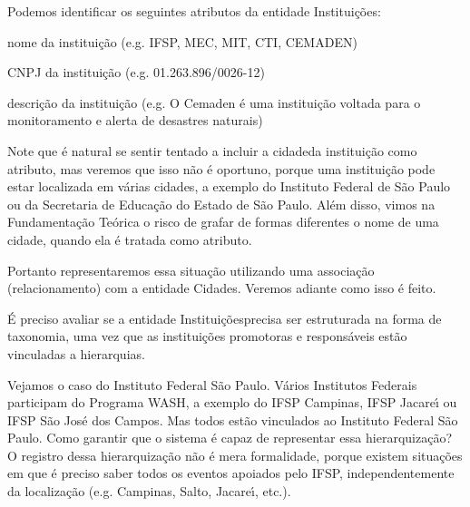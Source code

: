 \documentclass[
12pt,		%
openright,	%
twoside,  %
a4paper,			%
chapter=TITLE,		%
english,			%
french,				%
spanish,			%
brazil				%
]{USPSC-classe/USPSC}
\begin{document}
Podemos identificar os seguintes atributos da entidade \textquotedbl Institui\c{c}\~oes\textquotedbl :





\begin{alineas}
\item nome da institui\c{c}\~ao (e.g. IFSP, MEC, MIT, CTI, CEMADEN)
\item CNPJ da institui\c{c}\~ao (e.g.  01.263.896/0026-12)
\item descri\c{c}\~ao da institui\c{c}\~ao (e.g. \textquotedbl O Cemaden \'e uma institui\c{c}\~ao voltada para o monitoramento e alerta de desastres naturais\textquotedbl )
\end{alineas}

Note que \'e natural se sentir tentado a incluir a \textquotedbl cidade\textquotedbl  da institui\c{c}\~ao como atributo, mas veremos que isso n\~ao \'e oportuno, porque uma institui\c{c}\~ao pode estar localizada em v\'arias cidades, a exemplo do Instituto Federal de S\~ao Paulo ou da Secretaria de Educa\c{c}\~ao do Estado de S\~ao Paulo. Al\'em disso, vimos na Fundamenta\c{c}\~ao Te\'orica o risco de grafar de formas diferentes o nome de uma cidade, quando ela \'e tratada como atributo.




Portanto representaremos essa situa\c{c}\~ao utilizando uma associa\c{c}\~ao (relacionamento) com a entidade \textquotedbl Cidades\textquotedbl . Veremos adiante como isso \'e feito.




\'E preciso avaliar se a entidade \textquotedbl Institui\c{c}\~oes\textquotedbl  precisa ser estruturada na forma de taxonomia, uma vez que as institui\c{c}\~oes promotoras e respons\'aveis est\~ao vinculadas a hierarquias.




Vejamos o caso do Instituto Federal S\~ao Paulo. V\'arios Institutos Federais participam do Programa WASH, a exemplo do IFSP Campinas, IFSP Jacare\'{\i} ou IFSP S\~ao Jos\'e dos Campos. Mas todos est\~ao vinculados ao Instituto Federal S\~ao Paulo. Como garantir que o sistema \'e capaz de representar essa hierarquiza\c{c}\~ao? O registro dessa hierarquiza\c{c}\~ao n\~ao \'e mera formalidade, porque existem situa\c{c}\~oes em que \'e preciso saber todos os eventos apoiados pelo IFSP, independentemente da localiza\c{c}\~ao (e.g. Campinas, Salto, Jacare\'{\i}, etc.).
\end{document}
